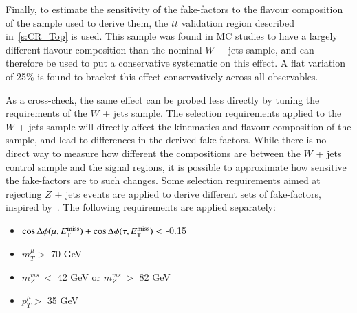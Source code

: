 
Finally, to estimate the sensitivity of the fake-factors to the flavour composition of the
sample used to derive them, the $t\bar{t}$ validation region described in~\ref{s:CR_Top}
is used. This sample was found in MC studies to have a largely different flavour
composition than the nominal $W$ + jets sample, and can therefore be used to put a
conservative systematic on this effect.  A flat variation of 25\% is found to bracket this
effect conservatively across all observables.

As a cross-check, the same effect can be probed less directly by tuning the requirements
of the $W$ + jets sample. The selection requirements applied to the $W$ + jets sample will
directly affect the kinematics and flavour composition of the sample, and lead to
differences in the derived fake-factors. While there is no direct way to measure how
different the compositions are between the $W$ + jets control sample and the signal
regions, it is possible to approximate how sensitive the fake-factors are to such changes.
Some selection requirements aimed at rejecting $Z$ + jets events are applied to derive
different sets of fake-factors, inspired by~\cite{zttnote,tauidnote}.  The following
requirements are applied separately:

\begin{itemize}
\item $\cos{\Delta\phi(\mu, \ensuremath{E_{\text{T}}^{\text{miss}}})} + \cos{\Delta\phi(\tau, \ensuremath{E_{\text{T}}^{\text{miss}}})} <$ -0.15
\item $m_{T}^{\mu} >$ 70 GeV
\item $m_{Z}^{vis.} <$ 42 GeV or $m_{Z}^{vis.} >$ 82 GeV
\item $p_{T}^{\mu} >$ 35 GeV
\end{itemize}

